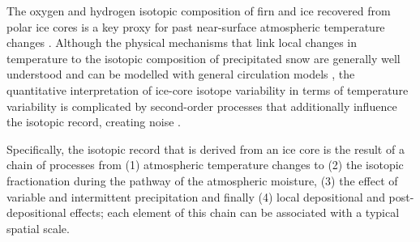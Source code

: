 \documentclass[cp, manuscript]{copernicus}
\begin{document}

\introduction

The oxygen and hydrogen isotopic composition of firn and ice recovered from
polar ice cores is a key proxy for past near-surface atmospheric temperature
changes \citep{Dansgaard1964,Lorius1969,Masson-Delmotte2008,Sjolte2011}.
Although the physical mechanisms that link local changes in temperature to the
isotopic composition of precipitated snow are generally well understood
\citep{Dansgaard1964,Craig1965,Jouzel1984} and can be modelled with general
circulation models
\citep{Joussaume1984,Werner2011,Werner2016,Sjolte2011,Goursaud2018}, the
quantitative interpretation of ice-core isotope variability in terms of
temperature variability is complicated by second-order processes that
additionally influence the isotopic record, creating noise \citep{Munch2018a}.

Specifically, the isotopic record that is derived from an ice core is the result
of a chain of processes from (1) atmospheric temperature changes to (2) the
isotopic fractionation during the pathway of the atmospheric moisture, (3) the
effect of variable and intermittent precipitation and finally (4) local
depositional and post-depositional effects; each element of this chain can be
associated with a typical spatial scale.
\end{document}
